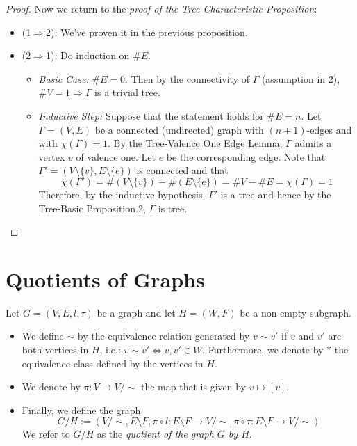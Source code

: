 \begin{proof}
    Now we return to the \textit{proof of the Tree Characteristic Proposition}:
    \begin{itemize}
        \item (1$\Rightarrow$2): We've proven it in the previous proposition.
        \item (2$\Rightarrow$1): Do induction on $\#E$.
        \begin{itemize}
            \item \textit{Basic Case:} $\#E=0$. Then by the connectivity of $\Gamma$ (assumption in 2), $\#V =1 \Rightarrow \Gamma$ is a trivial tree.
            \item \textit{Inductive Step:} Suppose that the statement holds for $\#E=n$. Let $\Gamma=(V,E)$ be a connected (undirected) graph with $(n+1)$-edges and with $\chi(\Gamma)=1$. By the Tree-Valence One Edge Lemma, $\Gamma$ admits a vertex $v$ of valence one. Let $e$ be the corresponding edge. Note that $\Gamma'= (V \setminus \{v\}, E\setminus \{e\})$ is connected and that
            $$\chi (\Gamma') =\#(V \setminus \{v\}) - \#( E\setminus \{e\}) =\#V-\#E= \chi(\Gamma)=1$$
            Therefore, by the inductive hypothesis, $\Gamma'$ is a tree and hence by the Tree-Basic Proposition.2, $\Gamma$ is tree.
        \end{itemize}
    \end{itemize}
\end{proof}

\section{Quotients of Graphs}

\begin{definition}
    Let $G=(V,E,l,\tau)$ be a graph and let $H=(W,F)$ be a non-empty subgraph.
    \begin{itemize}
        \item We define $\sim$ by the equivalence relation generated by $v \sim v'$ if $v$ and $v'$ are both vertices in $H$, i.e.: $v \sim v' \Leftrightarrow v,v'\in W$. Furthermore, we denote by $*$ the equivalence class defined by the vertices in $H$.
        \item We denote by $\pi: V \to V/\sim$ the map that is given by $v \mapsto [v]$.
        \item Finally, we define the graph
        $$G/H:= (V/\sim, E \setminus F, \pi \circ l: E \setminus F \to V/\sim, \pi \circ \tau: E \setminus F \to V/\sim)$$
        We refer to $G/H$ as the \textit{quotient of the graph $G$ by $H$}.
    \end{itemize}
\end{definition}

